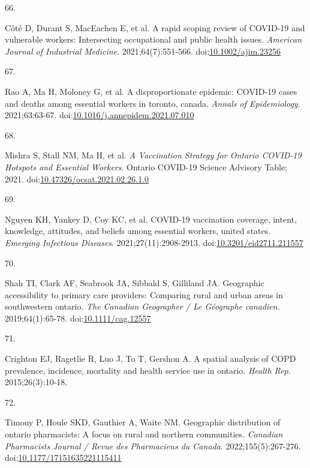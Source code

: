 \documentclass[
]{article}
\newlength{\cslhangindent}
\newlength{\csllabelwidth}
\newlength{\cslentryspacingunit} %
\newenvironment{CSLReferences}[2] %
 {%
  \setlength{\parindent}{0pt}
  \ifodd #1
  \let\oldpar\par
  \def\par{\hangindent=\cslhangindent\oldpar}
  \fi
  \setlength{\parskip}{#2\cslentryspacingunit}
 }%
 {}
\newcommand{\CSLLeftMargin}[1]{\parbox[t]{\csllabelwidth}{#1}}
\newcommand{\CSLRightInline}[1]{\parbox[t]{\linewidth - \csllabelwidth}{#1}\break}
\begin{document}
\begin{CSLReferences}{0}{0}
\leavevmode{}%
\CSLLeftMargin{66. }%
\CSLRightInline{Côté D, Durant S, MacEachen E, et al. A rapid scoping
review of {COVID}-19 and vulnerable workers: Intersecting occupational
and public health issues. \emph{American Journal of Industrial
Medicine}. 2021;64(7):551-566.
doi:\href{https://doi.org/10.1002/ajim.23256}{10.1002/ajim.23256}}

\leavevmode{}%
\CSLLeftMargin{67. }%
\CSLRightInline{Rao A, Ma H, Moloney G, et al. A disproportionate
epidemic: {COVID}-19 cases and deaths among essential workers in
toronto, canada. \emph{Annals of Epidemiology}. 2021;63:63-67.
doi:\href{https://doi.org/10.1016/j.annepidem.2021.07.010}{10.1016/j.annepidem.2021.07.010}}

\leavevmode{}%
\CSLLeftMargin{68. }%
\CSLRightInline{Mishra S, Stall NM, Ma H, et al. \emph{A Vaccination
Strategy for Ontario {COVID}-19 Hotspots and Essential Workers}. Ontario
{COVID}-19 Science Advisory Table; 2021.
doi:\href{https://doi.org/10.47326/ocsat.2021.02.26.1.0}{10.47326/ocsat.2021.02.26.1.0}}

\leavevmode{}%
\CSLLeftMargin{69. }%
\CSLRightInline{Nguyen KH, Yankey D, Coy KC, et al. {COVID}-19
vaccination coverage, intent, knowledge, attitudes, and beliefs among
essential workers, united states. \emph{Emerging Infectious Diseases}.
2021;27(11):2908-2913.
doi:\href{https://doi.org/10.3201/eid2711.211557}{10.3201/eid2711.211557}}

\leavevmode{}%
\CSLLeftMargin{70. }%
\CSLRightInline{Shah TI, Clark AF, Seabrook JA, Sibbald S, Gilliland JA.
Geographic accessibility to primary care providers: Comparing rural and
urban areas in southwestern ontario. \emph{The Canadian Geographer / Le
G{é}ographe canadien}. 2019;64(1):65-78.
doi:\href{https://doi.org/10.1111/cag.12557}{10.1111/cag.12557}}

\leavevmode{}%
\CSLLeftMargin{71. }%
\CSLRightInline{Crighton EJ, Ragetlie R, Luo J, To T, Gershon A. A
spatial analysis of {COPD} prevalence, incidence, mortality and health
service use in ontario. \emph{Health Rep}. 2015;26(3):10-18.}

\leavevmode{}%
\CSLLeftMargin{72. }%
\CSLRightInline{Timony P, Houle SKD, Gauthier A, Waite NM. Geographic
distribution of ontario pharmacists: A focus on rural and northern
communities. \emph{Canadian Pharmacists Journal / Revue des Pharmaciens
du Canada}. 2022;155(5):267-276.
doi:\href{https://doi.org/10.1177/17151635221115411}{10.1177/17151635221115411}}


\end{CSLReferences}
\end{document}
